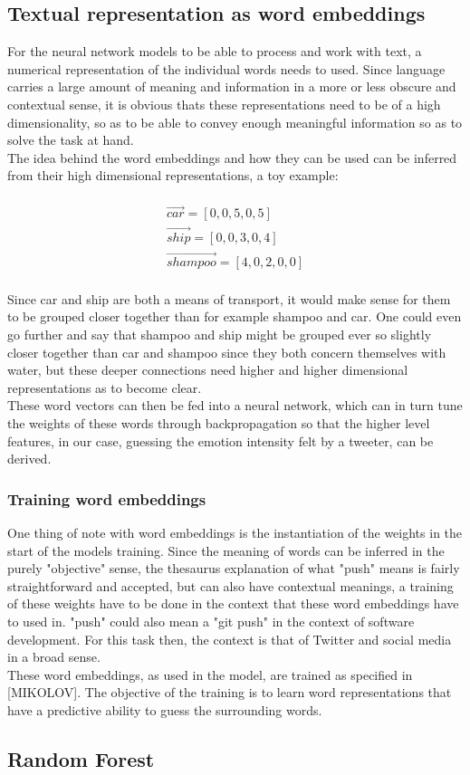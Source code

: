\subsection{Textual representation as word embeddings}
For the neural network models to be able to process and work with text, a numerical representation of the individual words needs to used. Since language carries a large amount of meaning and information in a more or less obscure and contextual sense, it is obvious thats these representations need to be of a high dimensionality, so as to be able to convey enough meaningful information so as to solve the task at hand.\\
The idea behind the word embeddings and how they can be used can be inferred from their high dimensional representations, a toy example:\\
\\
\begin{equation}
\begin{aligned}
\vec{car} = [0,0,5,0,5]\\
\vec{ship} = [0,0,3,0,4]\\
\vec{shampoo} = [4,0,2,0,0]
\end{aligned}
\end{equation}\\
Since car and ship are both a means of transport, it would make sense for them to be grouped closer together than for example shampoo and car. One could even go further and say that shampoo and ship might be grouped ever so slightly closer together than car and shampoo since they both concern themselves with water, but these deeper connections need higher and higher dimensional representations as to become clear.\\
These word vectors can then be fed into a neural network, which can in turn tune the weights of these words through backpropagation so that the higher level features, in our case, guessing the emotion intensity felt by a tweeter, can be derived.

\subsubsection{Training word embeddings}
One thing of note with word embeddings is the instantiation of the weights in the start of the models training. Since the meaning of words can be inferred in the purely "objective" sense, the thesaurus explanation of what "push" means is fairly straightforward and accepted, but can also have contextual meanings, a training of these weights have to be done in the context that these word embeddings have to used in. "push" could also mean a "git push" in the context of software development. For this task then, the context is that of Twitter and social media in a broad sense.\\
These word embeddings, as used in the model, are trained as specified in [MIKOLOV]. The objective of the training is to learn word representations that have a predictive ability to guess the surrounding words. 
\subsection{Random Forest}